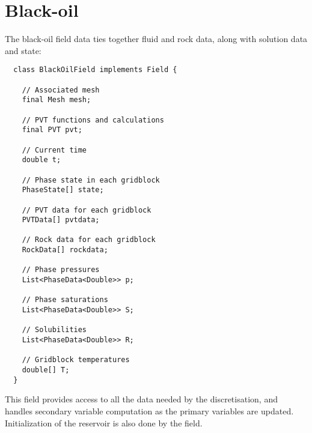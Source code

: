 \chapter{Black-oil}

\minitoc



The black-oil field data ties together fluid and rock data, along with
solution data and state:

\begin{lstlisting}
  class BlackOilField implements Field {

    // Associated mesh
    final Mesh mesh;

    // PVT functions and calculations
    final PVT pvt;

    // Current time
    double t;

    // Phase state in each gridblock
    PhaseState[] state;

    // PVT data for each gridblock
    PVTData[] pvtdata;

    // Rock data for each gridblock
    RockData[] rockdata;

    // Phase pressures
    List<PhaseData<Double>> p;

    // Phase saturations
    List<PhaseData<Double>> S;

    // Solubilities
    List<PhaseData<Double>> R;

    // Gridblock temperatures
    double[] T;
  }
\end{lstlisting}

This field provides access to all the data needed by the
discretisation, and handles secondary variable computation as the
primary variables are updated. Initialization of the reservoir is also
done by the field.





